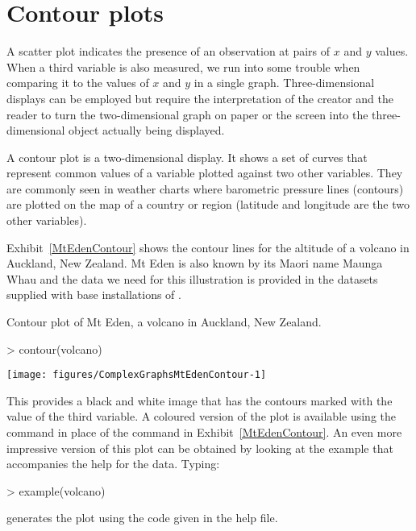  
 
\section{Contour plots} 
 
A scatter plot indicates the presence of an observation at pairs of $x$ and $y$ values. When a third variable is also measured, we run into some trouble when comparing it to the values of $x$ and $y$ in a single graph. Three-dimensional displays can be employed but require the interpretation of the creator and the reader to turn the two-dimensional graph on paper or the screen into the three-dimensional object actually being displayed. 
 
A contour plot is a two-dimensional display. It shows a set of curves that represent common values of a variable plotted against two other variables. They are commonly seen in weather charts where barometric pressure lines (contours) are plotted on the map of a country or region (latitude and longitude are the two other variables). 
 
Exhibit~\ref{MtEdenContour} shows the contour lines for the altitude of a volcano in Auckland, New Zealand. Mt Eden is also known by its Maori name Maunga Whau and the data we need for this illustration is provided in the datasets supplied with base installations of \R{}. 
\begin{exhibit} 
\begin{center} 
\caption{Contour plot of Mt Eden, a volcano in Auckland, New Zealand.} 
\label{MtEdenContour} 
\begin{Schunk}
\begin{Sinput}
> contour(volcano) 
\end{Sinput}

\texttt{[image: figures/ComplexGraphsMtEdenContour-1]} \end{Schunk}
\end{center} 
\end{exhibit} 
 
This provides a black and white image that has the contours marked with the value of the third variable. A coloured version of the plot is available using the  command in place of the  command in Exhibit~\ref{MtEdenContour}. An even more impressive version of this plot can be obtained by looking at the example that accompanies the help for the  data. Typing: 
\begin{Schunk}
\begin{Sinput}
> example(volcano) 
\end{Sinput}
\end{Schunk}
generates the plot using the code given in the help file. 
 
